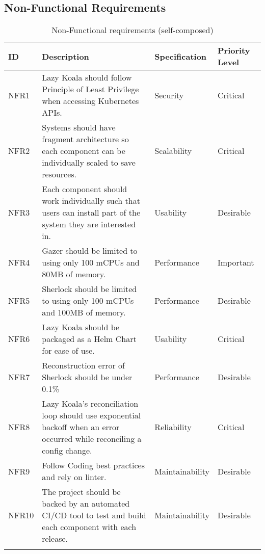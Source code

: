 \subsection{Non-Functional Requirements}

\begin{longtable}{|p{13mm}|p{89mm}|p{26mm}|p{18mm}|}
\hline
    \textbf{ID} &
    \textbf{Description} &
    \textbf{Specification} &
    \textbf{Priority Level} \\ \hline
    
    NFR1 &
    Lazy Koala should follow Principle of Least Privilege when accessing Kubernetes APIs. &
    Security &
    Critical \\ \hline
    
    NFR2 &
    Systems should have fragment architecture so each component can be individually scaled to save resources. &
    Scalability &
    Critical \\ \hline
    
    NFR3 &
    Each component should work individually such that users can install part of the system they are interested in. &
    Usability &
    Desirable \\ \hline
    
    NFR4 &
    Gazer should be limited to using only 100 mCPUs and 80MB of memory. &
    Performance &
    Important \\ \hline
    
    NFR5 &
    Sherlock should be limited to using only 100 mCPUs and 100MB of memory. &
    Performance &
    Desirable \\ \hline
    
    NFR6 &
    Lazy Koala should be packaged as a Helm Chart for ease of use. &
    Usability &
    Critical \\ \hline
    
    NFR7 &
    Reconstruction error of Sherlock should be under 0.1\% &
    Performance &
    Desirable \\ \hline
    
    NFR8 &
    Lazy Koala’s reconciliation loop should use exponential backoff when an error occurred while reconciling a config change. &
    Reliability &
    Critical \\ \hline
    
    NFR9 &
    Follow Coding best practices and rely on linter. &
    Maintainability &
    Desirable \\ \hline
    
    NFR10 &
    The project should be backed by an automated CI/CD tool to test and build each component with each release. &
    Maintainability &
    Desirable \\ \hline

\caption{Non-Functional requirements (self-composed)}
\end{longtable}